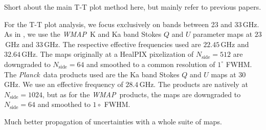 \documentclass[twocolumn]{../../common/aa}
\def\WMAP{\emph{WMAP}}
\def\Planck{\emph{Planck}}
\begin{document}
Short about the main T-T plot method here, but mainly refer to previous papers.

For the T-T plot  analysis, we focus exclusively on bands between 23 and 33\,GHz. As in \citet{fuskeland2014}, we use the \WMAP\ K and Ka band Stokes $Q$ and $U$ parameter maps at $23$\,GHz and $33$\,GHz. The respective effective frequencies used are $22.45$\,GHz and $32.64$\,GHz. The maps originally at a HealPIX pixelization of $N_\textrm{side}=512$ are downgraded to $N_\textrm{side}=64$ and smoothed to a common resolution of $1^\circ$ FWHM.
The \Planck\ data products used are the Ka band Stokes $Q$ and $U$ maps at $30$\,GHz. We use an effective frequency of $28.4$\,GHz.  The products are natively at $N_\textrm{side}=1024$, but as for the \WMAP\ products, the maps are downgraded to $N_\textrm{side}=64$ and smoothed to $1\circ$ FWHM.

Much better propagation of uncertainties with a whole suite of maps.
\end{document}

